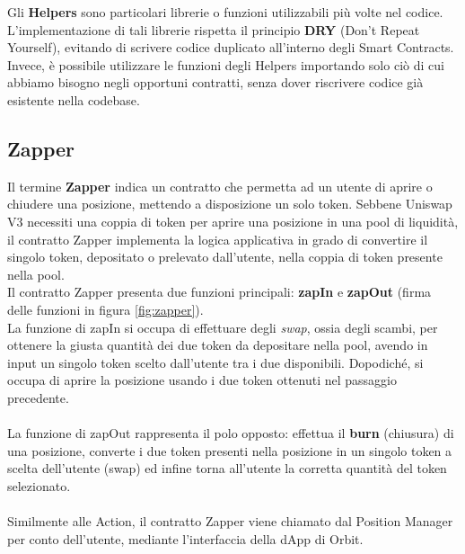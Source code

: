 \documentclass[12pt,a4paper]{report}
\begin{document}
Gli \textbf{Helpers} sono particolari librerie o funzioni utilizzabili più volte nel codice.
L'implementazione di tali librerie rispetta il principio \textbf{DRY} (Don't Repeat Yourself), evitando di scrivere codice duplicato all'interno degli Smart Contracts.
\\Invece, è possibile utilizzare le funzioni degli Helpers importando solo ciò di cui abbiamo bisogno negli opportuni contratti, senza dover riscrivere codice già esistente nella codebase.

\subsection{Zapper}

Il termine \textbf{Zapper} indica un contratto che permetta ad un utente di aprire o chiudere una posizione, mettendo a disposizione un solo token. Sebbene Uniswap V3 necessiti una coppia di token per aprire una posizione in una pool di liquidità, il contratto Zapper implementa la logica applicativa in grado di convertire il singolo token, depositato o prelevato dall'utente, nella coppia di token presente nella pool.
\\Il contratto Zapper presenta due funzioni principali: \textbf{zapIn} e \textbf{zapOut} (firma delle funzioni in figura \ref{fig:zapper}).
\\La funzione di zapIn si occupa di effettuare degli \textit{swap}, ossia degli scambi, per ottenere la giusta quantità dei due token da depositare nella pool, avendo in input un singolo token scelto dall'utente tra i due disponibili.
Dopodiché, si occupa di aprire la posizione usando i due token ottenuti nel passaggio precedente.
\\\\La funzione di zapOut rappresenta il polo opposto: effettua il \textbf{burn} (chiusura) di una posizione, converte i due token presenti nella posizione in un singolo token a scelta dell'utente (swap) ed infine torna all'utente la corretta quantità del token selezionato.
\\\\Similmente alle Action, il contratto Zapper viene chiamato dal Position Manager per conto dell'utente, mediante l'interfaccia della dApp di Orbit.
\end{document}
